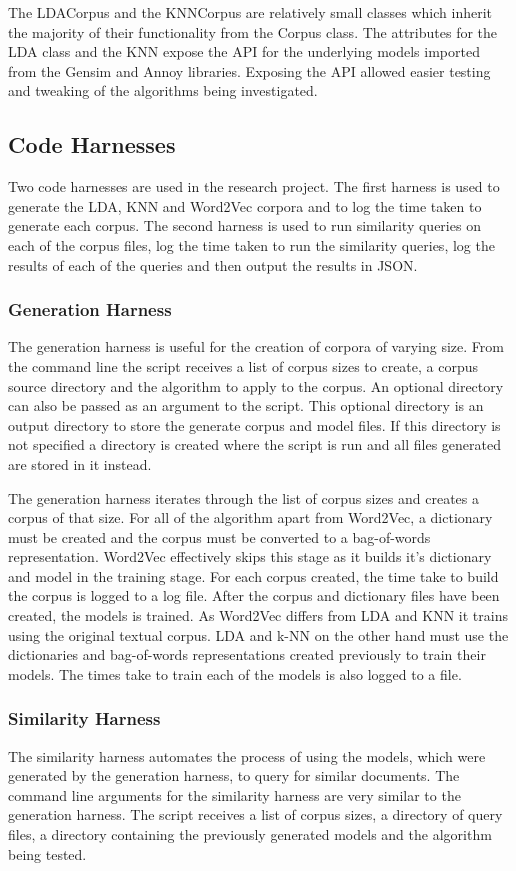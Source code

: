 The LDACorpus and the KNNCorpus are relatively small classes which inherit the majority of their functionality from the Corpus class.
The attributes for the LDA class and the KNN expose the API for the underlying models imported from the Gensim and Annoy libraries.
Exposing the API allowed easier testing and tweaking of the algorithms being investigated.

\subsection{Code Harnesses}
Two code harnesses are used in the research project. The first harness is used to generate the LDA, KNN and Word2Vec corpora and to log the time taken to generate each corpus.
The second harness is used to run similarity queries on each of the corpus files, log the time taken to run the similarity queries, log the results of each of the queries and then output the results in JSON.

\subsubsection{Generation Harness}
The generation harness is useful for the creation of corpora of varying size.
From the command line the script receives a list of corpus sizes to create, a corpus source directory and the algorithm to apply to the corpus.
An optional directory can also be passed as an argument to the script.
This optional directory is an output directory to store the generate corpus and model files.
If this directory is not specified a directory is created where the script is run and all files generated are stored in it instead.

The generation harness iterates through the list of corpus sizes and creates a corpus of that size.
For all of the algorithm apart from Word2Vec, a dictionary must be created and the corpus must be converted to a bag-of-words representation.
Word2Vec effectively skips this stage as it builds it's dictionary and model in the training stage.
For each corpus created, the time take to build the corpus is logged to a log file.
After the corpus and dictionary files have been created, the models is trained.
As Word2Vec differs from LDA and KNN it trains using the original textual corpus.
LDA and k-NN on the other hand must use the dictionaries and bag-of-words representations created previously to train their models.
The times take to train each of the models is also logged to a file.

\subsubsection{Similarity Harness}
The similarity harness automates the process of using the models, which were generated by the generation harness, to query for similar documents.
The command line arguments for the similarity harness are very similar to the generation harness.
The script receives a list of corpus sizes, a directory of query files, a directory containing the previously generated models and the algorithm being tested.

